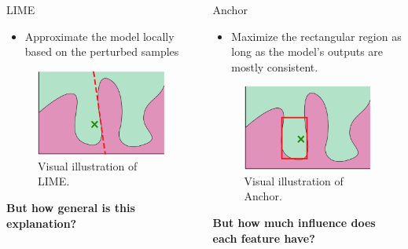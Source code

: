 \documentclass[aspectratio=169]{slide-en}
\begin{document}
\begin{frame}{}
  \vspace{1.5em}
  \begin{columns}[t]
    \begin{column}{0.45\textwidth}
      LIME%
      \begin{itemize}
        \item Approximate the model locally based on the perturbed samples
      \end{itemize}
      \begin{figure}
        \includegraphics[scale=.25]{img/visual-lime}
        \caption{Visual illustration of LIME\@.}
      \end{figure}
      \textbf{But how general is this explanation?}
    \end{column}
    \begin{column}{0.55\textwidth}
      Anchor
      \begin{itemize}
        \item Maximize the rectangular region as long as
              the model's outputs are mostly consistent.
      \end{itemize}
      \begin{figure}
        \includegraphics[scale=.25]{img/visual-anchor}
        \caption{Visual illustration of Anchor.}
      \end{figure}
      \textbf{But how much influence does each feature have?}
    \end{column}
  \end{columns}
\end{frame}
\end{document}
